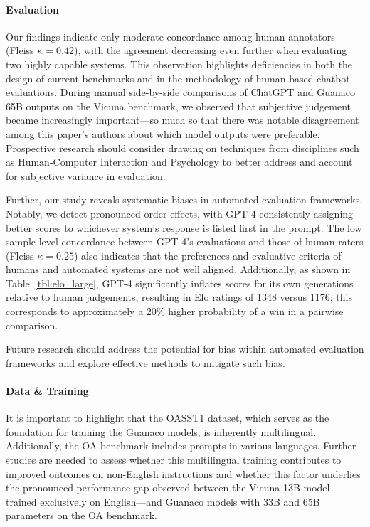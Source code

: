 \paragraph{Evaluation}

Our findings indicate only moderate concordance among human annotators (Fleiss $\kappa=0.42$), with the agreement decreasing even further when evaluating two highly capable systems. This observation highlights deficiencies in both the design of current benchmarks and in the methodology of human-based chatbot evaluations. During manual side-by-side comparisons of ChatGPT and {Guanaco} 65B outputs on the Vicuna benchmark, we observed that subjective judgement became increasingly important—so much so that there was notable disagreement among this paper’s authors about which model outputs were preferable. Prospective research should consider drawing on techniques from disciplines such as Human-Computer Interaction and Psychology to better address and account for subjective variance in evaluation.

Further, our study reveals systematic biases in automated evaluation frameworks. Notably, we detect pronounced order effects, with GPT-4 consistently assigning better scores to whichever system’s response is listed first in the prompt. The low sample-level concordance between GPT-4’s evaluations and those of human raters (Fleiss $\kappa=0.25$) also indicates that the preferences and evaluative criteria of humans and automated systems are not well aligned. Additionally, as shown in Table~\ref{tbl:elo_large}, GPT-4 significantly inflates scores for its own generations relative to human judgements, resulting in Elo ratings of 1348 versus 1176; this corresponds to approximately a 20\% higher probability of a win in a pairwise comparison.

Future research should address the potential for bias within automated evaluation frameworks and explore effective methods to mitigate such bias.

\paragraph{Data \& Training} It is important to highlight that the OASST1 dataset, which serves as the foundation for training the {Guanaco} models, is inherently multilingual. Additionally, the OA benchmark includes prompts in various languages. Further studies are needed to assess whether this multilingual training contributes to improved outcomes on non-English instructions and whether this factor underlies the pronounced performance gap observed between the Vicuna-13B model—trained exclusively on English—and {Guanaco} models with 33B and 65B parameters on the OA benchmark.

